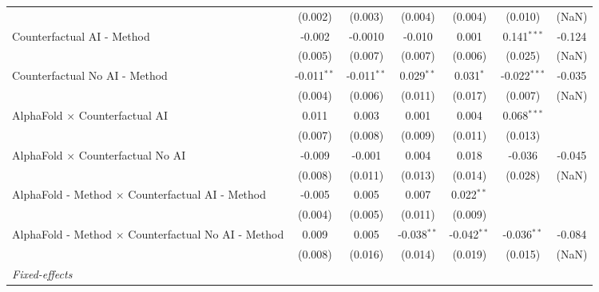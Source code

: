 \begin{tabular}{lcccccc}
                                                              & (0.002)       & (0.003)       & (0.004)       & (0.004)       & (0.010)        & (NaN)\\   
   Counterfactual AI - Method                                 & -0.002        & -0.0010       & -0.010        & 0.001         & 0.141$^{***}$  & -0.124\\   
                                                              & (0.005)       & (0.007)       & (0.007)       & (0.006)       & (0.025)        & (NaN)\\   
   Counterfactual No AI - Method                              & -0.011$^{**}$ & -0.011$^{**}$ & 0.029$^{**}$  & 0.031$^{*}$   & -0.022$^{***}$ & -0.035\\   
                                                              & (0.004)       & (0.006)       & (0.011)       & (0.017)       & (0.007)        & (NaN)\\   
   AlphaFold $\times$ Counterfactual AI                       & 0.011         & 0.003         & 0.001         & 0.004         & 0.068$^{***}$  &   \\   
                                                              & (0.007)       & (0.008)       & (0.009)       & (0.011)       & (0.013)        &   \\   
   AlphaFold $\times$ Counterfactual No AI                    & -0.009        & -0.001        & 0.004         & 0.018         & -0.036         & -0.045\\   
                                                              & (0.008)       & (0.011)       & (0.013)       & (0.014)       & (0.028)        & (NaN)\\   
   AlphaFold - Method $\times$ Counterfactual AI - Method     & -0.005        & 0.005         & 0.007         & 0.022$^{**}$  &                &   \\   
                                                              & (0.004)       & (0.005)       & (0.011)       & (0.009)       &                &   \\   
   AlphaFold - Method $\times$ Counterfactual No AI - Method  & 0.009         & 0.005         & -0.038$^{**}$ & -0.042$^{**}$ & -0.036$^{**}$  & -0.084\\   
                                                              & (0.008)       & (0.016)       & (0.014)       & (0.019)       & (0.015)        & (NaN)\\   
   \midrule
   \emph{Fixed-effects}\\

\end{tabular}

